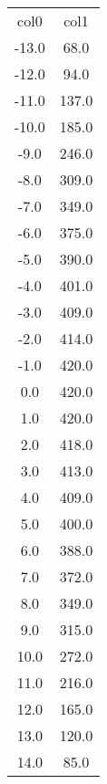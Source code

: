 \begin{table}
\begin{tabular}{cc}
col0 & col1 \\
-13.0 & 68.0 \\
-12.0 & 94.0 \\
-11.0 & 137.0 \\
-10.0 & 185.0 \\
-9.0 & 246.0 \\
-8.0 & 309.0 \\
-7.0 & 349.0 \\
-6.0 & 375.0 \\
-5.0 & 390.0 \\
-4.0 & 401.0 \\
-3.0 & 409.0 \\
-2.0 & 414.0 \\
-1.0 & 420.0 \\
0.0 & 420.0 \\
1.0 & 420.0 \\
2.0 & 418.0 \\
3.0 & 413.0 \\
4.0 & 409.0 \\
5.0 & 400.0 \\
6.0 & 388.0 \\
7.0 & 372.0 \\
8.0 & 349.0 \\
9.0 & 315.0 \\
10.0 & 272.0 \\
11.0 & 216.0 \\
12.0 & 165.0 \\
13.0 & 120.0 \\
14.0 & 85.0 \\
\end{tabular}
\end{table}
